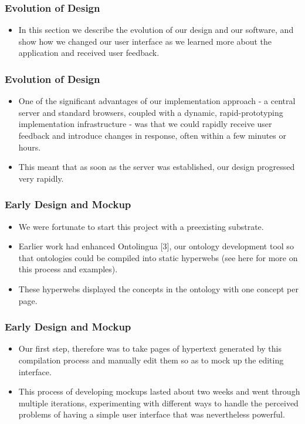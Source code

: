 \documentclass{beamer}
\begin{document}
\begin{frame}
\frametitle{Evolution of Design}

\begin{itemize}
\item In this section we describe the evolution of our design and our software, and show how we changed our user interface as we learned more about the application and received user feedback.
\end{itemize}

\end{frame}

\begin{frame}
\frametitle{Evolution of Design}

\begin{itemize}
\item One of the significant advantages of our implementation approach - a central server and standard browsers, coupled with a dynamic, rapid-prototyping implementation infrastructure - was that we could rapidly receive user feedback and introduce changes in response, often within a few minutes or hours.
\item This meant that as soon as the server was established, our design progressed very rapidly.
\end{itemize}

\end{frame}

\begin{frame}
\frametitle{Early Design and Mockup}

\begin{itemize}
\item We were fortunate to start this project with a preexisting substrate.
\item Earlier work had enhanced Ontolingua [3], our ontology development tool so that ontologies could be compiled into static hyperwebs (see here for more on this process and examples).
\item These hyperwebs displayed the concepts in the ontology with one concept per page.
\end{itemize}

\end{frame}

\begin{frame}
\frametitle{Early Design and Mockup}

\begin{itemize}
\item Our first step, therefore was to take pages of hypertext generated by this compilation process and manually edit them so as to mock up the editing interface.
\item This process of developing mockups lasted about two weeks and went through multiple iterations, experimenting with different ways to handle the perceived problems of having a simple user interface that was nevertheless powerful.
\end{itemize}

\end{frame}
\end{document}
